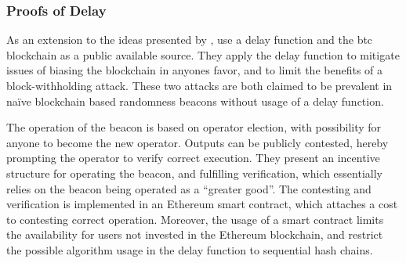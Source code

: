 \subsubsection{Proofs of Delay}%
\label{ssub:proofs_of_delay}

As an extension to the ideas presented by \citet{randomzoo}, \citet{bunz2017proofsof} use a delay function and the \gls{btc} blockchain as a public available source.
They apply the delay function to mitigate issues of biasing the blockchain in anyones favor, and to limit the benefits of a block-withholding attack.
These two attacks are both claimed to be prevalent in naïve blockchain based randomness beacons without usage of a delay function.

The operation of the beacon is based on operator election, with possibility for anyone to become the new operator.
Outputs can be publicly contested, hereby prompting the operator to verify correct execution.
They present an incentive structure for operating the beacon, and fulfilling verification, which essentially relies on the beacon being operated as a \enquote{greater good}.
The contesting and verification is implemented in an Ethereum smart contract, which attaches a cost to contesting correct operation.
Moreover, the usage of a smart contract limits the availability for users not invested in the Ethereum blockchain, and restrict the possible algorithm usage in the delay function to sequential hash chains.


